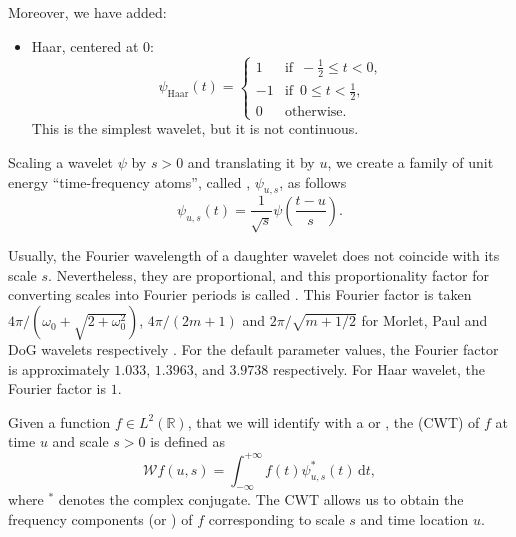 Moreover, we have added:
\begin{itemize}
\item Haar, centered at $0$:
\[
\psi _{\textrm{Haar}}(t)=\left\{
\begin{array}{rl}
1 & \textrm{if }\,-\frac{1}{2}\leq t <0, \\
-1 & \textrm{if }\,0\leq t <\frac{1}{2}, \\
0 & \textrm{otherwise}.
\end{array}
\right.
\]
This is the simplest wavelet, but it is not continuous.
\end{itemize}

Scaling a wavelet $\psi $ by $s>0$ and translating it by $u$, we create a family of unit energy ``time-frequency atoms'', called , $\psi _{u,s}$, as follows
\begin{equation}
\label{eq:psius}
\psi_{u,s}(t)=\frac{1}{\sqrt{s}}\psi \left( \frac{t-u}{s}\right) .
\end{equation}

\begin{rmk}
\label{rem:ff}
Usually, the Fourier wavelength of a daughter wavelet does not coincide with its scale $s$. Nevertheless, they are proportional, and this proportionality factor for converting scales into Fourier periods is called . This Fourier factor is taken $4\pi/\left( \omega _0+\sqrt{2+\omega_0^2}\right) $, $4\pi/\left( 2m+1\right) $ and $2\pi / \sqrt{m+1/2}$ for Morlet, Paul and DoG wavelets respectively \citep{tor98}. For the default parameter values, the Fourier factor is approximately $1.033$, $1.3963$, and $3.9738$ respectively. For Haar wavelet, the Fourier factor is $1$.
\end{rmk}

Given a function $f\in L^2\left( \mathbb{R}\right) $, that we will identify with a  or , the  (CWT) of $f$ at time $u$ and scale $s>0$ is defined as
\begin{equation}
\label{eq:cwt}
\mathcal{W}f\left( u,s\right) =\int _{-\infty}^{+\infty}f(t)\psi_{u,s}^* (t) \, \textrm{d}t,
\end{equation}
where $ ^*$ denotes the complex conjugate. The CWT allows us to obtain the frequency components (or ) of $f$ corresponding to scale $s$ and time location $u$.

